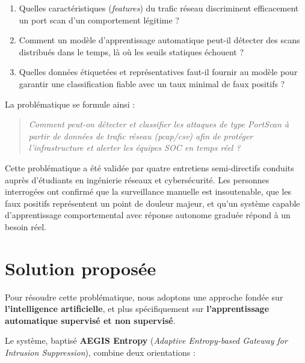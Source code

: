 \documentclass[12pt,a4paper]{article}
\begin{document}
\begin{enumerate}[nosep,leftmargin=1.5em]
  \item Quelles caract\'{e}ristiques (\textit{features}) du trafic r\'{e}seau discriminent
        efficacement un port scan d'un comportement l\'{e}gitime ?
  \item Comment un mod\`{e}le d'apprentissage automatique peut-il d\'{e}tecter des
        scans distribu\'{e}s dans le temps, l\`{a} o\`{u} les seuils statiques \'{e}chouent ?
  \item Quelles donn\'{e}es \'{e}tiquet\'{e}es et repr\'{e}sentatives faut-il fournir
        au mod\`{e}le pour garantir une classification fiable avec un taux minimal
        de faux positifs ?
\end{enumerate}

\vspace{0.5em}
\noindent La probl\'{e}matique se formule ainsi :

\begin{quote}
\itshape
\textit{Comment peut-on d\'{e}tecter et classifier les attaques de type PortScan
\`{a} partir de donn\'{e}es de trafic r\'{e}seau (pcap/csv) afin de prot\'{e}ger
l'infrastructure et alerter les \'{e}quipes SOC en temps r\'{e}el ?}
\end{quote}

Cette probl\'{e}matique a \'{e}t\'{e} valid\'{e}e par quatre entretiens semi-directifs
conduits aupr\`{e}s d'\'{e}tudiants en ing\'{e}nierie r\'{e}seaux et cybers\'{e}curit\'{e}.
Les personnes interrog\'{e}es ont confirm\'{e} que la surveillance manuelle est insoutenable,
que les faux positifs repr\'{e}sentent un point de douleur majeur, et qu'un syst\`{e}me
capable d'apprentissage comportemental avec r\'{e}ponse autonome gradu\'{e}e r\'{e}pond
\`{a} un besoin r\'{e}el.

\section{Solution propos\'{e}e}

Pour r\'{e}soudre cette probl\'{e}matique, nous adoptons une approche fond\'{e}e sur
\textbf{l'intelligence artificielle}, et plus sp\'{e}cifiquement sur
\textbf{l'apprentissage automatique supervis\'{e} et non supervis\'{e}}.

Le syst\`{e}me, baptis\'{e} \textbf{AEGIS Entropy} (\textit{Adaptive Entropy-based
Gateway for Intrusion Suppression}), combine deux orientations :
\end{document}
